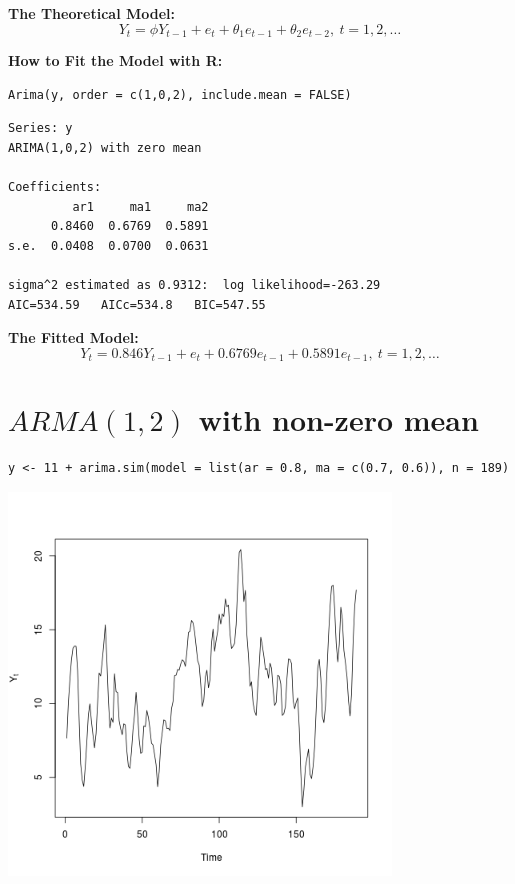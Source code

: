 \documentclass[12pt]{article}
\begin{document}
\noindent
\textbf{The Theoretical Model:} 
\[
Y_{t} = \phi Y_{t - 1} + e_{t} + \theta_{1} e_{t - 1} + \theta_{2} e_{t - 2},\ t = 1,2,\ldots
\]

\noindent
\textbf{How to Fit the Model with R:}


\begin{verbatim}
Arima(y, order = c(1,0,2), include.mean = FALSE)
\end{verbatim}




\begin{verbatim}
Series: y 
ARIMA(1,0,2) with zero mean     

Coefficients:
         ar1     ma1     ma2
      0.8460  0.6769  0.5891
s.e.  0.0408  0.0700  0.0631

sigma^2 estimated as 0.9312:  log likelihood=-263.29
AIC=534.59   AICc=534.8   BIC=547.55
\end{verbatim}

\noindent
\textbf{The Fitted Model:} 
\[
Y_{t} =  0.846 Y_{t - 1} + e_{t} +  0.6769 e_{t - 1} +  0.5891 e_{t - 1},\ t = 1,2,\ldots
\]
\section*{$ARMA(1,2)$ with non-zero mean}
\label{sec-6}


\begin{verbatim}
y <- 11 + arima.sim(model = list(ar = 0.8, ma = c(0.7, 0.6)), n = 189)
\end{verbatim}





\includegraphics[width=4.0in]{img/arma12nzm.png}
\end{document}
